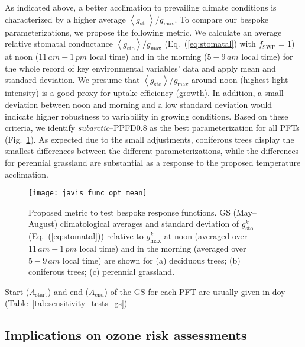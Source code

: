 \documentclass[bg, manuscript]{copernicus}
\begin{document}
As indicated above, a better acclimation to prevailing climate conditions is characterized by a higher average $\left<g_\mathrm{sto}\right>/g_\mathrm{max}$. To compare our bespoke parameterizations, we propose the following metric. We calculate an average relative stomatal conductance $\left<g_\mathrm{sto}\right>/g_\mathrm{max}$ (Eq.~(\ref{eq:stomatal}) with $f_\mathrm{SWP}=1$) at noon ($11\,\unit{am}-1\,\unit{pm}$ local time) and in the morning ($5-9\,\unit{am}$ local time) for the whole record of key environmental variables' data and apply mean and standard deviation. We presume that $\left<g_\mathrm{sto}\right>/g_\mathrm{max}$ around noon (highest light intensity) is a good proxy for  uptake efficiency (growth). In addition, a small deviation between noon and morning and a low standard deviation would indicate higher robustness to variability in growing conditions. Based on these criteria, we identify \emph{subarctic}--PPFD0.8 as the best parameterization for all PFTs (Fig.~\ref{fig:javis_func_opt_mean}). As expected due to the small adjustments, coniferous trees display the smallest differences between the different parameterizations, while the differences for perennial grassland are substantial as a response to the proposed temperature acclimation.

\begin{figure}[t]
  \texttt{[image: javis\_func\_opt\_mean]}
  \caption{Proposed metric to test bespoke response functions. GS (May--August) climatological averages and standard deviation of $g_\mathrm{sto}^k$ (Eq.~(\ref{eq:stomatal})) relative to $g_\mathrm{max}^k$ at noon (averaged over $11\,\unit{am}-1\,\unit{pm}$ local time) and in the morning (averaged over $5-9\,\unit{am}$ local time) are shown for (a) deciduous trees; (b) coniferous trees; (c) perennial grassland.}
  \label{fig:javis_func_opt_mean}
\end{figure}

Start ($A_\text{start}$) and end ($A_\text{end}$) of the GS for each PFT are usually given in \unit{doy} (Table~\ref{tab:sensitivity_tests_gs})




\subsection{Implications on ozone risk assessments}
\label{subsec:do3se_results}
\end{document}
